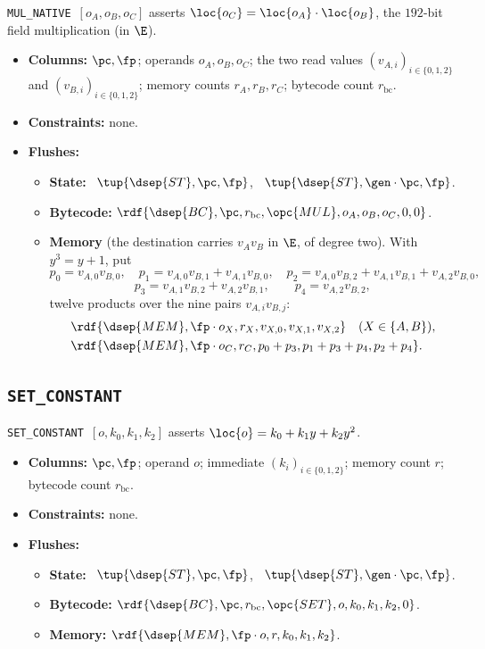 \texttt{MUL\_NATIVE}\ $[o_A,o_B,o_C]$ asserts $\loc{o_C}=\loc{o_A} \cdot \loc{o_B}$, the $192$-bit field multiplication (in $\E$).
\begin{itemize}
\item \textbf{Columns:} $\pc,\fp$; operands $o_A,o_B,o_C$; the two read values $(v_{A,i})_{i\in\{0,1,2\}}$ and $(v_{B,i})_{i\in\{0,1,2\}}$; memory counts $r_A,r_B,r_C$; bytecode count $r_{\mathrm{bc}}$.
\item \textbf{Constraints:} none.
\item \textbf{Flushes:}
  \begin{itemize}
  \item \textbf{State:} \pull\ $\tup{\dsep{ST},\pc,\fp}$, \push\ $\tup{\dsep{ST},\gen\cdot\pc,\fp}$.
  \item \textbf{Bytecode:} $\rdf{\dsep{BC},\pc,r_{\mathrm{bc}},\opc{MUL},o_A,o_B,o_C,0,0}$.
  \item \textbf{Memory} (the destination carries $v_Av_B$ in $\E$, of degree two). With $y^3=y+1$, put
    \[
    p_0=v_{A,0}v_{B,0},\quad
    p_1=v_{A,0}v_{B,1}+v_{A,1}v_{B,0},\quad
    p_2=v_{A,0}v_{B,2}+v_{A,1}v_{B,1}+v_{A,2}v_{B,0},
    \]
    \[
    p_3=v_{A,1}v_{B,2}+v_{A,2}v_{B,1},\qquad
    p_4=v_{A,2}v_{B,2},
    \]
    twelve products over the nine pairs $v_{A,i}v_{B,j}$:
    \begin{align*}
      &\rdf{\dsep{MEM},\fp\cdot o_X,r_X,v_{X,0},v_{X,1},v_{X,2}}\quad(X\in\{A,B\}),\\
      &\rdf{\dsep{MEM},\fp\cdot o_C,r_C,p_0+p_3,p_1+p_3+p_4,p_2+p_4}.
    \end{align*}
  \end{itemize}
\end{itemize}

\subsection{\texttt{SET\_CONSTANT}}\label{sec:tab-set}

\texttt{SET\_CONSTANT}\ $[o,k_0,k_1,k_2]$ asserts $\loc{o}=k_0+k_1y+k_2y^{2}$.
\begin{itemize}
\item \textbf{Columns:} $\pc,\fp$; operand $o$; immediate $(k_i)_{i\in\{0,1,2\}}$; memory count $r$; bytecode count $r_{\mathrm{bc}}$.
\item \textbf{Constraints:} none.
\item \textbf{Flushes:}
  \begin{itemize}
  \item \textbf{State:} \pull\ $\tup{\dsep{ST},\pc,\fp}$, \push\ $\tup{\dsep{ST},\gen\cdot\pc,\fp}$.
  \item \textbf{Bytecode:} $\rdf{\dsep{BC},\pc,r_{\mathrm{bc}},\opc{SET},o,k_0,k_1,k_2,0}$.
  \item \textbf{Memory:} $\rdf{\dsep{MEM},\fp\cdot o,r,k_0,k_1,k_2}$.
  \end{itemize}
\end{itemize}

